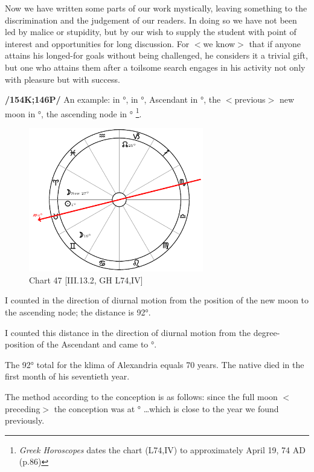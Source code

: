 Now we have written some parts of our work mystically, leaving something to the discrimination and the judgement of our readers. In doing so we have not been led by malice or stupidity, but by our wish to supply the student with point of interest and opportunities for long discussion. For $<$we know$>$ that if anyone attains his longed-for goals without being challenged, he considers it a trivial gift, but one
who attains them after a toilsome search engages in his activity not only with pleasure but with success.

\textbf{/154K;146P/} An example: \Sun\xspace in \Taurus\xspace 1°, \Moon\xspace in \Gemini\xspace 16°, Ascendant in \Taurus\xspace 14°, the $<$previous$>$ new moon in \Aries\xspace 27°, the ascending node in \Capricorn\xspace 25°
\footnote{\textit{Greek Horoscopes} dates the chart (L74,IV) to approximately April 19, 74 AD (p.86)}.

\clearpage
\begin{figure}
\centering
\vspace{-20pt}
\includegraphics[width=0.68\textwidth]{charts/3_13_2}
\caption{Chart 47 [III.13.2, GH L74,IV]}
\label{fig:chart47}
\end{figure}

I counted in the direction of diurnal motion from the position of the new moon to the ascending node; the distance is 92°. 

I counted this distance in the direction of diurnal motion from the degree-position of the Ascendant and came to \Aquarius\xspace 12°. 

The 92° total for the klima of Alexandria equals 70 years. The native died in the first month of his seventieth year. 

The method according to the conception is as follows: since the full moon $<$preceding$>$ the conception was at \Capricorn\xspace 21° \ldots which is close to the year we found previously.

